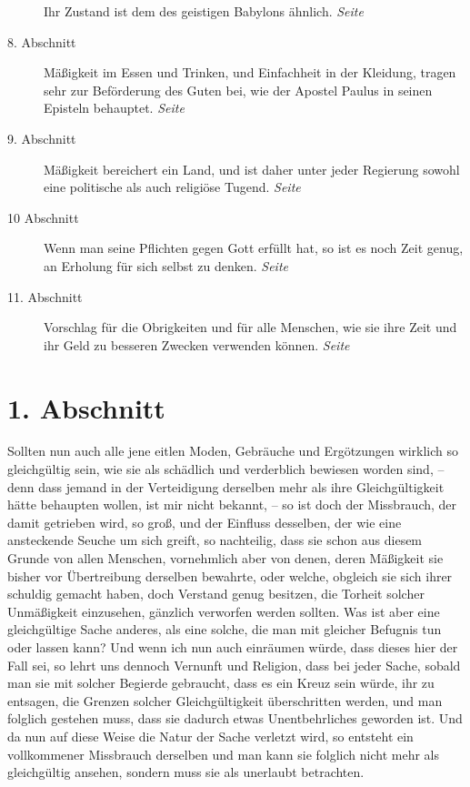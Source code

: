 \begin{description}
Ihr Zustand ist dem des geistigen Babylons ähnlich.
\dotfill \textit{Seite~\pageref{kap18_ab7}}\\
\item[8. Abschnitt] Mäßigkeit im Essen und Trinken, und Einfachheit in der
Kleidung, tragen sehr zur Beförderung des Guten bei, wie der Apostel Paulus in
seinen Episteln behauptet.
\dotfill \textit{Seite~\pageref{kap18_ab8}}\\
\item[9. Abschnitt] Mäßigkeit bereichert ein Land, und ist daher unter jeder
Regierung sowohl eine politische als auch religiöse Tugend.
\dotfill \textit{Seite~\pageref{kap18_ab9}}\\
\item[10 Abschnitt] Wenn man seine Pflichten gegen Gott erfüllt hat, so ist es
noch Zeit genug, an Erholung für sich selbst zu denken.
\dotfill \textit{Seite~\pageref{kap18_ab10}}\\
\item[11. Abschnitt] Vorschlag für die Obrigkeiten und für alle Menschen, wie
sie ihre Zeit und ihr Geld zu besseren Zwecken verwenden können.
\dotfill \textit{Seite~\pageref{kap18_ab11}}\\

\end{description}

\newpage

\section{1. Abschnitt} \label{kap18_ab1}

Sollten nun auch alle jene eitlen Moden, Gebräuche und Ergötzungen wirklich so
gleichgültig sein, wie sie als schädlich und verderblich bewiesen worden sind,
-- denn dass jemand in der Verteidigung derselben mehr als ihre Gleichgültigkeit
hätte behaupten wollen, ist mir nicht bekannt, -- so ist doch der Missbrauch,
der
damit getrieben wird, so groß, und der Einfluss desselben, der wie eine
ansteckende Seuche um sich greift, so nachteilig, dass sie schon aus diesem
Grunde von allen Menschen, vornehmlich aber von denen, deren Mäßigkeit sie
bisher vor Übertreibung derselben bewahrte, oder welche, obgleich sie sich
ihrer schuldig gemacht haben, doch Verstand genug besitzen, die Torheit solcher
Unmäßigkeit einzusehen, gänzlich verworfen werden sollten. Was ist aber eine
gleichgültige Sache anderes, als eine solche, die man mit gleicher Befugnis tun
oder lassen kann? Und wenn ich nun auch einräumen würde, dass dieses hier der
Fall sei, so lehrt uns dennoch Vernunft und Religion, dass bei jeder Sache,
sobald man sie mit solcher Begierde gebraucht, dass es ein Kreuz
sein würde, ihr
zu entsagen, die Grenzen solcher Gleichgültigkeit überschritten werden, und man
folglich gestehen muss, dass sie dadurch etwas Unentbehrliches geworden ist. Und
da nun auf diese Weise die Natur der Sache verletzt wird, so entsteht ein
vollkommener Missbrauch derselben und man kann sie folglich nicht mehr als
gleichgültig ansehen, sondern muss sie als unerlaubt betrachten.

